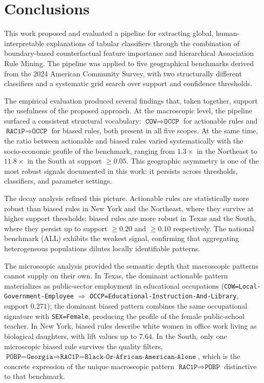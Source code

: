 
\section{Conclusions}
\label{sec:conclusions-summary}

This work proposed and evaluated a pipeline for extracting global, human-interpretable explanations of tabular classifiers through the combination of boundary-based counterfactual feature importance and hierarchical Association Rule Mining. The pipeline was applied to five geographical benchmarks derived from the 2024 American Community Survey, with two structurally different classifiers and a systematic grid search over support and confidence thresholds.

The empirical evaluation produced several findings that, taken together, support the usefulness of the proposed approach. At the macroscopic level, the pipeline surfaced a consistent structural vocabulary: $\texttt{COW} \Rightarrow \texttt{OCCP}$ for actionable rules and $\texttt{RAC1P} \Rightarrow \texttt{OCCP}$ for biased rules, both present in all five scopes. At the same time, the ratio between actionable and biased rules varied systematically with the socio-economic profile of the benchmark, ranging from $1.3\times$ in the Northeast to $11.8\times$ in the South at support $\geq 0.05$. This geographic asymmetry is one of the most robust signals documented in this work: it persists across thresholds, classifiers, and parameter settings.

The decay analysis refined this picture. Actionable rules are statistically more robust than biased rules in New York and the Northeast, where they survive at higher support thresholds; biased rules are more robust in Texas and the South, where they persist up to support $\geq 0.20$ and $\geq 0.10$ respectively. The national benchmark (ALL) exhibits the weakest signal, confirming that aggregating heterogeneous populations dilutes locally identifiable patterns.

The microscopic analysis provided the semantic depth that macroscopic patterns cannot supply on their own. In Texas, the dominant actionable pattern materializes as public-sector employment in educational occupations (\texttt{COW=Local-Government-Employee} $\Rightarrow$ \texttt{OCCP=Educational-Instruction-And-Library}, support $0.271$); the dominant biased pattern combines the same occupational signature with \texttt{SEX=Female}, producing the profile of the female public-school teacher. In New York, biased rules describe white women in office work living as biological daughters, with lift values up to $7.64$. In the South, only one microscopic biased rule survives the quality filters, $\texttt{POBP=Georgia} \Rightarrow \texttt{RAC1P=Black-Or-African-American-Alone}$, which is the concrete expression of the unique macroscopic pattern $\texttt{RAC1P} \Rightarrow \texttt{POBP}$ distinctive to that benchmark.

